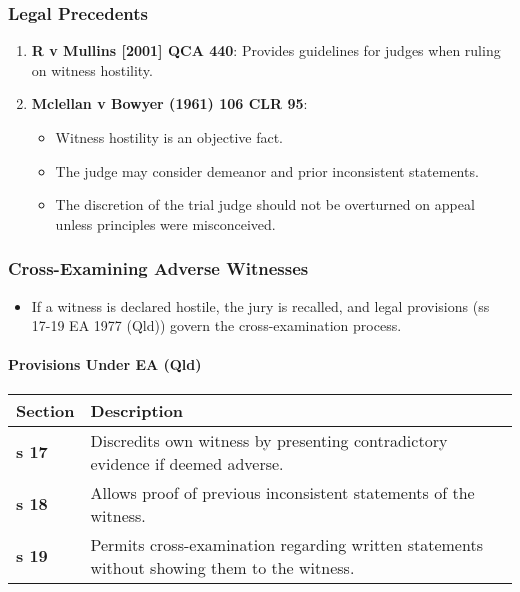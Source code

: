 \subsubsection{Legal Precedents}\label{legal-precedents}

\begin{enumerate}
\def\labelenumi{\arabic{enumi}.}
\tightlist
\item
  \textbf{R v Mullins {[}2001{]} QCA 440}: Provides guidelines for
  judges when ruling on witness hostility.
\item
  \textbf{Mclellan v Bowyer (1961) 106 CLR 95}:

  \begin{itemize}
  \tightlist
  \item
    Witness hostility is an objective fact.
  \item
    The judge may consider demeanor and prior inconsistent statements.
  \item
    The discretion of the trial judge should not be overturned on appeal
    unless principles were misconceived.
  \end{itemize}
\end{enumerate}

\subsubsection{Cross-Examining Adverse
Witnesses}\label{cross-examining-adverse-witnesses}

\begin{itemize}
\tightlist
\item
  If a witness is declared hostile, the jury is recalled, and legal
  provisions (ss 17-19 EA 1977 (Qld)) govern the cross-examination
  process.
\end{itemize}

\paragraph{Provisions Under EA (Qld)}\label{provisions-under-ea-qld}

\begin{longtable}[]{@{}
  >{\raggedright\arraybackslash}p{}
  >{\raggedright\arraybackslash}p{}@{}}
\toprule\noalign{}
\begin{minipage}[b]{\linewidth}\raggedright
Section
\end{minipage} & \begin{minipage}[b]{\linewidth}\raggedright
Description
\end{minipage} \\
\midrule\noalign{}
\endhead
\bottomrule\noalign{}
\endlastfoot
\textbf{s 17} & Discredits own witness by presenting contradictory
evidence if deemed adverse. \\
\textbf{s 18} & Allows proof of previous inconsistent statements of the
witness. \\
\textbf{s 19} & Permits cross-examination regarding written statements
without showing them to the witness. \\
\end{longtable}


